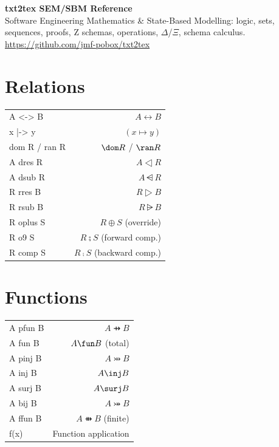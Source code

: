 \documentclass[10pt,landscape,a4paper]{article}
\begin{document}
\begin{center}
{\LARGE\bfseries txt2tex SEM/SBM Reference}\\[2pt]
{\small Software Engineering Mathematics \& State-Based Modelling: logic, sets, sequences, proofs, Z schemas, operations, \(\Delta\)/\(\Xi\), schema calculus.}\\[1pt]
{\footnotesize\color{gray}\url{https://github.com/jmf-pobox/txt2tex}}
\end{center}

\vspace{-2pt}

\begin{multicols}{3}
\raggedcolumns



\section{Relations}

\begin{tabularx}{\columnwidth}{LR}
A <-> B              & $A \rel B$ \\
x |-> y              & $(x \mapsto y)$ \\
dom R / ran R        & $\dom R$ / $\ran R$ \\
A dres R             & $A \dres R$ \\
A dsub R             & $A \ndres R$ \\
R rres B             & $R \rres B$ \\
R rsub B             & $R \nrres B$ \\
R oplus S            & $R \oplus S$ (override) \\
R o9 S               & $R \semi S$ (forward comp.) \\
R comp S             & $R \comp S$ (backward comp.) \\
\end{tabularx}

\section{Functions}

\begin{tabularx}{\columnwidth}{LR}
A pfun B             & $A \pfun B$ \\
A fun B              & $A \fun B$ (total) \\
A pinj B             & $A \pinj B$ \\
A inj B              & $A \inj B$ \\
A surj B             & $A \surj B$ \\
A bij B              & $A \bij B$ \\
A ffun B             & $A \ffun B$ (finite) \\
f(x)                 & Function application \\
\end{tabularx}


\end{multicols}
\end{document}
